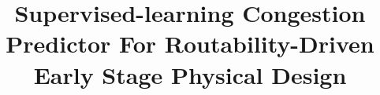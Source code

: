 \documentclass[conference]{IEEEtran}
\begin{document}
\title{Supervised-learning Congestion Predictor For Routability-Driven Early Stage Physical Design\\
}


\maketitle
\end{document}
